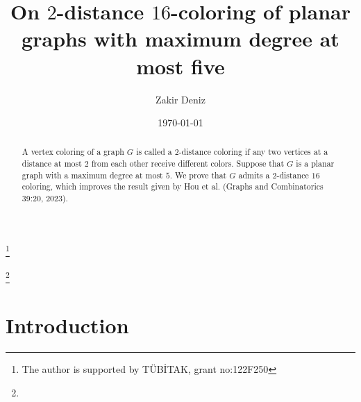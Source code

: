 \documentclass[12pt, reqno]{amsart}
\theoremstyle{plain}
\theoremstyle{definition}
\numberwithin{equation}{section}
\newcommand{\D}{\Delta}
\begin{document}


\title[2-distance coloring of planar graphs with girth five]{On $2$-distance $16$-coloring of planar graphs with maximum degree at most five}  %


\author{Zakir Deniz}
\thanks{The author is supported by T\" UB\. ITAK, grant no:122F250}
\address{Department of Mathematics, Duzce University, Duzce, 81620, Turkey.}

\date{\today}
\thanks{}
\subjclass[2010]{}


\begin{abstract}


A vertex coloring of a graph $G$ is called a 2-distance coloring if any two vertices at a distance at most $2$ from each other receive different colors. Suppose that $G$ is a planar graph with a maximum degree at most $5$. We prove that $G$ admits a $2$-distance $16$ coloring, which improves the result given by Hou et al. (Graphs and Combinatorics 39:20, 2023). 


\end{abstract}
\maketitle






\section{Introduction}
\end{document}
